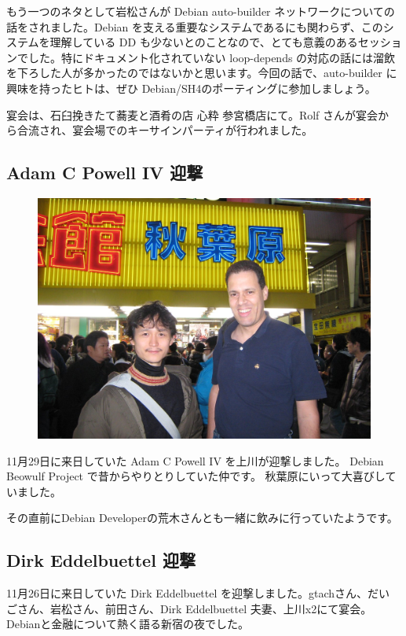 \documentclass[mingoth,a4paper]{jsarticle}
\begin{document}
もう一つのネタとして岩松さんが Debian auto-builder ネットワークについての
話をされました。Debian を支える重要なシステムであるにも関わらず、このシ
ステムを理解している DD も少ないとのことなので、とても意義のあるセッショ
ンでした。特にドキュメント化されていない loop-depends の対応の話には溜飲
を下ろした人が多かったのではないかと思います。今回の話で、auto-builder
に興味を持ったヒトは、ぜひ Debian/SH4のポーティングに参加しましょう。

宴会は、石臼挽きたて蕎麦と酒肴の店 心粋 参宮橋店にて。Rolf さんが宴会か
ら合流され、宴会場でのキーサインパーティが行われました。

\subsection{Adam C Powell IV 迎撃}
\begin{figure}
\includegraphics[width=1\hsize]{image200912/acp.jpg}
\end{figure}

11月29日に来日していた Adam C Powell IV を上川が迎撃しました。
Debian Beowulf Project で昔からやりとりしていた仲です。
秋葉原にいって大喜びしていました。

その直前にDebian Developerの荒木さんとも一緒に飲みに行っていたようです。

\subsection{Dirk Eddelbuettel 迎撃}

11月26日に来日していた Dirk Eddelbuettel を迎撃しました。gtachさん、だい
ごさん、岩松さん、前田さん、Dirk Eddelbuettel 夫妻、上川x2にて宴会。
Debianと金融について熱く語る新宿の夜でした。
\end{document}
